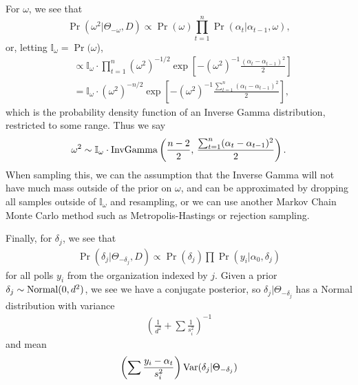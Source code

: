 \documentclass[thesis.tex]{subfiles}
\begin{document}
For \(\omega\), we see that \[
	\Pr(\omega^2 | \Theta_{-\omega}, D) \propto \Pr(\omega) \prod_{t=1}^n \Pr(\alpha_t | \alpha_{t-1}, \omega),
\] or, letting \(\mathbb{I}_\omega = \Pr(\omega\)), \begin{align}
	&\propto \mathbb{I}_\omega \cdot \prod_{t=1}^n (\omega^2)^{-1/2} \exp\left[ - (\omega^2)^{-1} \frac{(\alpha_t - \alpha_{t-1})^2}{2} \right] \\
	&= \mathbb{I}_\omega \cdot (\omega^2)^{-n/2} \exp\left[ - (\omega^2)^{-1} \frac{\sum_{t=1}^n(\alpha_t - \alpha_{t-1})^2}{2} \right],
\end{align} which is the probability density function of an Inverse Gamma distribution, restricted to some range. Thus we say \[
	\omega^2 \sim \mathbb{I}_\omega \cdot \operatorname{InvGamma}\left( \frac{n - 2}{2},\, \frac{\sum_{t=1}^n(\alpha_t - \alpha_{t-1})^2}{2} \right).
\] When sampling this, we can the assumption that the Inverse Gamma will not have much mass outside of the prior on \(\omega\), and can be approximated by dropping all samples outside of \(\mathbb{I}_\omega\) and resampling, or we can use another Markov Chain Monte Carlo method such as Metropolis-Hastings or rejection sampling.

Finally, for \(\delta_j\), we see that \begin{align}
	\Pr(\delta_j | \Theta_{-\delta_j}, D) \propto \Pr(\delta_j) \prod \Pr(y_i | \alpha_0, \delta_j)
\end{align} for all polls \(y_i\) from the organization indexed by \(j\). Given a prior \(\delta_j \sim \operatorname{Normal}(0, d^2)\), we see we have a conjugate posterior, so  \(\delta_j | \Theta_{-\delta_j} \) has a Normal distribution with variance \begin{align}
	\left(\frac{1}{d^2} + \sum\frac{1}{s_i^2}\right)^{-1}
\end{align} and mean \begin{align}
	\left(\sum\frac{y_i - \alpha_t}{s_i^2}\right) \operatorname{Var}(\delta_j | \Theta_{-\delta_j})
\end{align}
\end{document}
